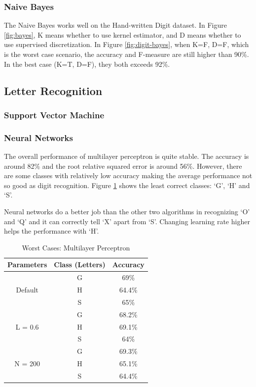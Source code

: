 \documentclass[11pt]{article}
\begin{document}
\subsubsection{Naive Bayes}
The Naive Bayes works well on the Hand-written Digit dataset. In Figure \ref{fig:bayes}, K means whether to use kernel estimator, and D means whether to use supervised discretization. In Figure \ref{fig:digit-bayes}, when K=F, D=F, which is the worst case scenario, the accuracy and F-measure are still higher than 90\%. In the best case (K=T, D=F), they both exceeds 92\%.

\subsection{Letter Recognition}
\subsubsection{Support Vector Machine}

\subsubsection{Neural Networks}
The overall performance of multilayer perceptron is quite stable. The accuracy is around 82\% and the root relative squared error is around 56\%. However, there are some classes with relatively low accuracy making the average performance not so good as digit recognition. Figure \ref{tbl:ann} shows the least correct classes: `G', `H' and `S'.

Neural networks do a better job than the other two algorithms in recognizing `O' and `Q' and it can correctly tell `X' apart from `S'. Changing learning rate higher helps the performance with `H'.

\begin{table}[!htb]

\centering
\begin{tabular}{c  c  c} \hline

Parameters & Class (Letters) & Accuracy \\\hline
\multirow{3}{*}{Default} & G & 69\% \\
	& H & 64.4\% \\
	& S & 65\% \\\hline
\multirow{3}{*}{L = 0.6} & G & 68.2\% \\
	& H & 69.1\% \\
	& S & 64\% \\\hline
\multirow{3}{*}{N = 200} & G & 69.3\% \\
	& H & 65.1\% \\
	& S & 64.4\% \\\hline
\end{tabular}
\caption{Worst Cases: Multilayer Perceptron} %
\label{tbl:ann}
\end{table}
\end{document}
